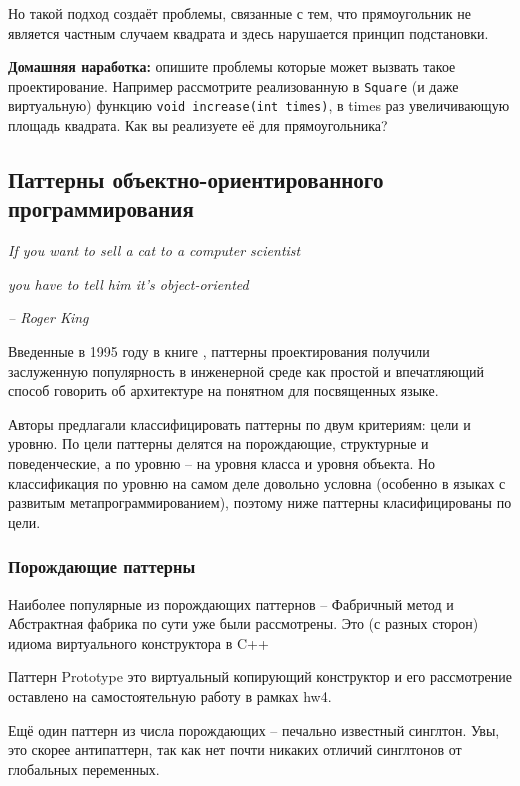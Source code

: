 \documentclass[a4paper,12pt,oneside]{article}
\begin{document}


Но такой подход создаёт проблемы, связанные с тем, что прямоугольник не является частным случаем квадрата и здесь нарушается принцип подстановки. 

\textbf{Домашняя наработка:} опишите проблемы которые может вызвать такое проектирование. Например рассмотрите реализованную в \lstinline!Square! (и даже виртуальную) функцию \lstinline!void increase(int times)!, в times раз увеличивающую площадь квадрата. Как вы реализуете её для прямоугольника?

\pagebreak
\subsection{Паттерны объектно-ориентированного программирования}\label{DesPatterns}

\hfill\textit{If you want to sell a cat to a computer scientist}

\hfill\textit{you have to tell him it's object-oriented}{\vspace{0.5em}}

\hfill\textit{-- Roger King}

Введенные в 1995 году в книге \cite{DPatterns}, паттерны проектирования получили заслуженную популярность в инженерной среде как простой и впечатляющий способ говорить об архитектуре на понятном для посвященных языке.

Авторы предлагали классифицировать паттерны по двум критериям: цели и уровню. По цели паттерны делятся на порождающие, структурные и поведенческие, а по уровню -- на уровня класса и уровня объекта. Но классификация по уровню на самом деле довольно условна (особенно в языках с развитым метапрограммированием), поэтому ниже паттерны класифицированы по цели.

\subsubsection{Порождающие паттерны}

Наиболее популярные из порождающих паттернов -- Фабричный метод и Абстрактная фабрика по сути уже были рассмотрены. Это (с разных сторон) идиома виртуального конструктора в C++

Паттерн Prototype это виртуальный копирующий конструктор и его рассмотрение оставлено на самостоятельную работу в рамках hw4.

Ещё один паттерн из числа порождающих -- печально известный синглтон. Увы, это скорее антипаттерн, так как нет почти никаких отличий синглтонов от глобальных переменных.
\end{document}

